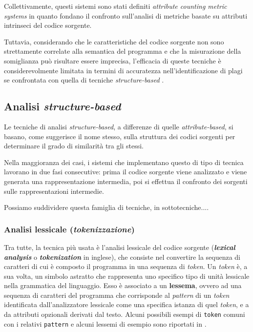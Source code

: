 Collettivamente, questi sistemi sono stati definiti \textit{attribute counting metric systems} in quanto fondano il confronto sull'analisi di metriche basate su attributi intrinseci del codice sorgente.

Tuttavia, considerando che le caratteristiche del codice sorgente non sono strettamente correlate alla semantica del programma e che la misurazione della somiglianza può risultare essere imprecisa, l'efficacia di queste tecniche è considerevolmente limitata in termini di accuratezza nell'identificazione di plagi se confrontata con quella di tecniche \textit{structure-based} \cite{es-plag}.

\subsection{Analisi \textit{structure-based}}
Le tecniche di analisi \textit{structure-based}, a differenze di quelle \textit{attribute-based}, si basano, come suggerisce il nome stesso, sulla struttura dei codici sorgenti per determinare il grado di similarità tra gli stessi.

Nella maggioranza dei casi, i sistemi che implementano questo di tipo di tecnica lavorano in due fasi consecutive: prima il codice sorgente viene analizzato e viene generata una rappresentazione intermedia, poi si effettua il confronto dei sorgenti sulle rappresentazioni intermedie.

Possiamo suddividere questa famiglia di tecniche, in sottotecniche....

\subsubsection{Analisi lessicale (\textit{tokenizzazione})}
Tra tutte, la tecnica più usata è l'analisi lessicale del codice sorgente (\textbf{\textit{lexical analysis}} o \textbf{\textit{tokenization}} in inglese), che consiste nel convertire la sequenza di caratteri di cui è composto il programma in una sequenza di \textit{token}.
%
Un \textit{token} è, a sua volta, un simbolo astratto che rappresenta uno specifico tipo di unità lessicale nella grammatica del linguaggio. 
%
Esso è associato a un \textbf{lessema}, ovvero ad una sequenza di caratteri del programma che corrisponde al \textit{pattern} di un \textit{token} identificata dall'analizzatore lessicale come una specifica istanza di quel \textit{token}, e a da attributi opzionali derivati dal testo.
%
Alcuni possibili esempi di \texttt{token} comuni con i relativi \texttt{pattern} e alcuni lessemi di esempio sono riportati in .


